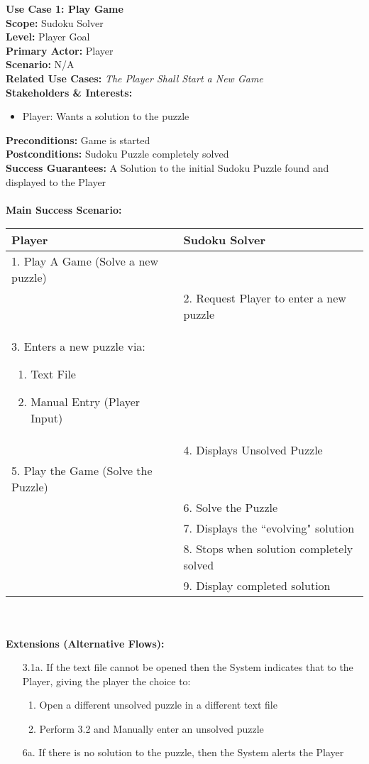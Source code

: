 \documentclass[letterpaper]{article}
\begin{document}
\noindent
\textbf{Use Case 1:  Play Game}\\
\textbf{Scope:  }Sudoku Solver\\
\textbf{Level:  }Player Goal\\
\textbf{Primary Actor:  }Player\\
\textbf{Scenario:  }N/A\\
\textbf{Related Use Cases:  }\textit{The Player Shall Start a
New Game}\\
\textbf{Stakeholders \& Interests:}
\begin{itemize}
\item  Player:  Wants a solution to the puzzle
\end{itemize}
\textbf{Preconditions:  }Game is started\\
\textbf{Postconditions:  }Sudoku Puzzle completely solved\\
\textbf{Success Guarantees:  }A Solution to the initial Sudoku Puzzle
found and displayed to the Player\\\\
\textbf{Main Success Scenario:  }\\
\begin{tabular}{|p{5.75cm}|p{5.75cm}|}\hline
\textbf{Player} & \textbf{Sudoku Solver}\\\hline
1.  Play A Game (Solve a new puzzle) & \\\hline
& 2.  Request Player to enter a new puzzle\\\hline
3.  Enters a new puzzle via:
\begin{enumerate}
\item Text File
\item Manual Entry (Player Input)
\end{enumerate} & \\\hline
& 4.  Displays Unsolved Puzzle\\\hline
5.  Play the Game (Solve the Puzzle) &\\\hline
& 6. Solve the Puzzle\\\hline
& 7. Displays the ``evolving" solution\\\hline
& 8. Stops when solution completely solved\\\hline
& 9. Display completed solution\\\hline
\end{tabular}\\\\
\textbf{Extensions (Alternative Flows):}
\begin{itemize}
\item[3.1a.]If the text file cannot be opened then the System
indicates that to the Player, giving the player the choice to:
\begin{enumerate}
\item Open a different unsolved puzzle in a different text file
\item Perform 3.2 and Manually enter an unsolved puzzle
\end{enumerate}
\item[6a.]If there is no solution to the puzzle, then the System
alerts the Player
\end{itemize}
\end{document}

